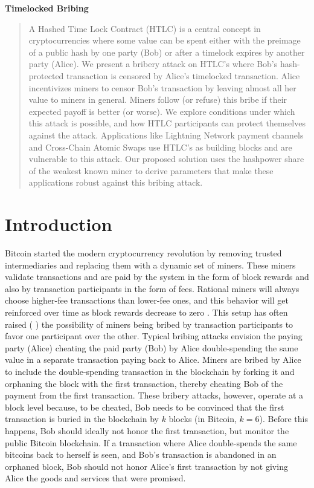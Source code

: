 \documentclass[runningheads]{llncs}
\begin{document}
%
\begin{center}
  \Large\bfseries\boldmath
  Timelocked Bribing
\end{center}

%
\begin{abstract}
A Hashed Time Lock Contract (HTLC) is a central concept in cryptocurrencies where some value can be spent either with the preimage of a public hash by one party (Bob) or after a timelock expires by another party (Alice). We present a bribery attack on HTLC's where Bob's hash-protected transaction is censored by Alice's timelocked transaction. Alice incentivizes miners to censor Bob's transaction by leaving almost all her value to miners in general. Miners follow (or refuse) this bribe if their expected payoff is better (or worse). We explore conditions under which this attack is possible, and how HTLC participants can protect themselves against the attack. Applications like Lightning Network payment channels and Cross-Chain Atomic Swaps use HTLC's as building blocks and are vulnerable to this attack. Our proposed solution uses the hashpower share of the weakest known miner to derive parameters that make these applications robust against this bribing attack.
\end{abstract}
\section{Introduction}
Bitcoin started the modern cryptocurrency revolution by removing trusted intermediaries and replacing them with a dynamic set of miners. These miners validate transactions and are paid by the system in the form of block rewards and also by transaction participants in the form of fees. Rational miners will always choose higher-fee transactions than lower-fee ones, and this behavior will get reinforced over time as block rewards decrease to zero \cite{bonneau2015sok}. This setup has often raised (\cite{feather_forking} \cite{whale_transactions} \cite{smart_contracts_for_bribing}) the possibility of miners being bribed by transaction participants to favor one participant over the other. Typical bribing attacks envision the paying party (Alice) cheating the paid party (Bob) by Alice double-spending the same value in a separate transaction paying back to Alice. Miners are bribed by Alice to include the double-spending transaction in the blockchain by forking it and orphaning the block with the first transaction, thereby cheating Bob of the payment from the first transaction. These bribery attacks, however, operate at a block level because, to be cheated, Bob needs to be convinced that the first transaction is buried in the blockchain by $k$ blocks (in Bitcoin, $k=6$). Before this happens, Bob should ideally not honor the first transaction, but monitor the public Bitcoin blockchain. If a transaction where Alice double-spends the same bitcoins back to herself is seen, and Bob's transaction is abandoned in an orphaned block, Bob should not honor Alice's first transaction by not giving Alice the goods and services that were promised.
\end{document}
